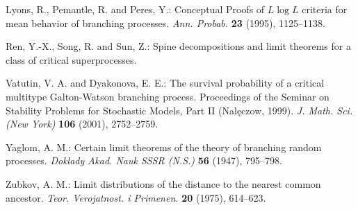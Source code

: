 \documentclass[ECP]{ejpecp} %
\begin{document}
\begin{thebibliography}{99}
  Lyons, R.,  Pemantle, R. and Peres, Y.:
  Conceptual Proofs of $ L \log L $ criteria for mean behavior of branching processes.
  \emph{Ann. Probab.} 
  \textbf{23} (1995), 1125--1138.
  
  Ren, Y.-X., Song, R. and Sun, Z.:
  Spine decompositions and limit theorems for a class of critical superprocesses.

  Vatutin, V. A. and Dyakonova,  E. E.:
  The survival probability of a critical multitype Galton-Watson branching process. 
  Proceedings of the Seminar on Stability Problems for Stochastic Models, Part II (Nal\k{e}czow, 1999).
  \emph{J.  Math. Sci. (New York)}
  \textbf{106} (2001), 2752--2759.

  Yaglom, A. M.:
  Certain limit theorems of the theory of branching random processes.
  \emph{Doklady Akad. Nauk SSSR (N.S.)}
  \textbf{56} (1947), 795--798.

  Zubkov, A. M.:
  Limit distributions of the distance to the nearest common ancestor.
  \emph{Teor. Verojatnost. i Primenen.}
  \textbf{20} (1975), 614--623.

\end{thebibliography}




 
\end{document}
